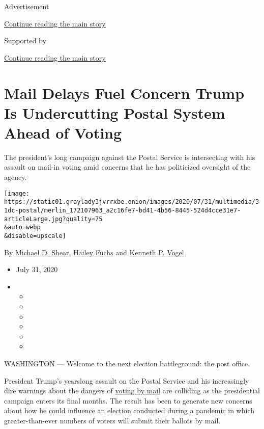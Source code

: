 Advertisement

\protect\hyperlink{after-top}{Continue reading the main story}

Supported by

\protect\hyperlink{after-sponsor}{Continue reading the main story}

\hypertarget{mail-delays-fuel-concern-trump-is-undercutting-postal-system-ahead-of-voting}{%
\section{Mail Delays Fuel Concern Trump Is Undercutting Postal System
Ahead of
Voting}\label{mail-delays-fuel-concern-trump-is-undercutting-postal-system-ahead-of-voting}}

The president's long campaign against the Postal Service is intersecting
with his assault on mail-in voting amid concerns that he has politicized
oversight of the agency.

\texttt{[image: https://static01.graylady3jvrrxbe.onion/images/2020/07/31/multimedia/31dc-postal/merlin\_172107963\_a2c16fe7-bd41-4b56-8445-524d4cce31e7-articleLarge.jpg?quality=75\\\&auto=webp\\\&disable=upscale]}

By \href{https://www.nytimes3xbfgragh.onion/by/michael-d-shear}{Michael
D. Shear},
\href{https://www.nytimes3xbfgragh.onion/by/hailey-fuchs}{Hailey Fuchs}
and \href{https://www.nytimes3xbfgragh.onion/by/kenneth-p-vogel}{Kenneth
P. Vogel}

\begin{itemize}
\item
  July 31, 2020
\item
  \begin{itemize}
  \item
  \item
  \item
  \item
  \item
  \item
  \end{itemize}
\end{itemize}

WASHINGTON --- Welcome to the next election battleground: the post
office.

President Trump's yearslong assault on the Postal Service and his
increasingly dire warnings about the dangers of
\href{https://www.nytimes3xbfgragh.onion/2020/08/03/us/politics/trump-mail-in-voting.html}{voting
by mail} are colliding as the presidential campaign enters its final
months. The result has been to generate new concerns about how he could
influence an election conducted during a pandemic in which
greater-than-ever numbers of voters will submit their ballots by mail.

